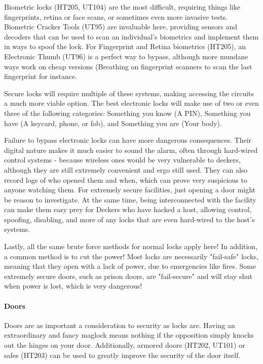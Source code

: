 \begin{multicols*}{2}
	Biometric locks (HT205, UT104) are the most difficult, requiring things like fingerprints, retina or face scans, or sometimes even more invasive tests. Biometric Cracker Tools (UT95) are invaluable here, providing sensors and decoders that can be used to scan an individual's biometrics and implement them in ways to spoof the lock. For Fingerprint and Retina biometrics (HT205), an Electronic Thumb (UT96) is a perfect way to bypass, although more mundane ways work on cheap versions (Breathing on fingerprint scanners to scan the last fingerprint for instance.
	
	Secure locks will require multiple of these systems, making accessing the circuits a much more viable option. The best electronic locks will make use of two or even three of the following categories: Something you know (A PIN), Something you have (A keycard, phone, or fob), and Something you are (Your body).
	
	Failure to bypass electronic locks can have more dangerous consequences. Their digital nature makes it much easier to sound the alarm, often through hard-wired control systems - because wireless ones would be very vulnerable to deckers, although they are still extremely convenient and ergo still used. They can also record logs of who opened them and when, which can prove very suspicious to anyone watching them. For extremely secure facilities, just opening a door might be reason to investigate. At the same time, being interconnected with the facility can make them easy prey for Deckers who have hacked a host, allowing control, spoofing, disabling, and more of any locks that are even hard-wired to the host's systems.
	
	Lastly, all the same brute force methods for normal locks apply here! In addition, a common method is to cut the power! Most locks are necessarily "fail-safe" locks, meaning that they open with a lack of power, due to emergencies like fires. Some extremely secure doors, such as prison doors, are "fail-secure" and will stay shut when power is lost, which is very dangerous!
	
	\paragraph{Doors}
	
	Doors are as important a consideration to security as locks are. Having an extraordinary and fancy maglock means nothing if the opposition simply knocks out the hinges on your door. Additionally, armored doors (HT202, UT101) or safes (HT203) can be used to greatly improve the security of the door itself.
	

\end{multicols*}

